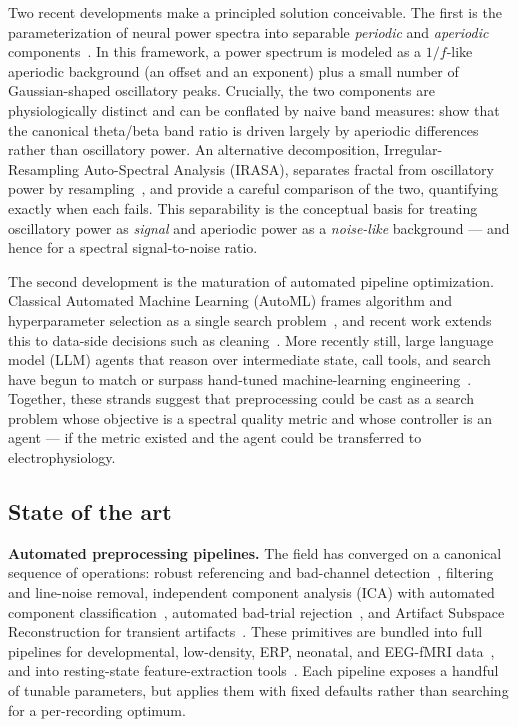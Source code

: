 Two recent developments make a principled solution conceivable. The first is the parameterization of neural power spectra into separable \emph{periodic} and \emph{aperiodic} components~\cite{HallerEtAl2018, DonoghueEtAl2020b}. In this framework, a power spectrum is modeled as a $1/f$-like aperiodic background (an offset and an exponent) plus a small number of Gaussian-shaped oscillatory peaks. Crucially, the two components are physiologically distinct and can be conflated by naive band measures: \citet{DonoghueEtAl2020a} show that the canonical theta/beta band ratio is driven largely by aperiodic differences rather than oscillatory power. An alternative decomposition, Irregular-Resampling Auto-Spectral Analysis (IRASA), separates fractal from oscillatory power by resampling~\cite{WenLiu2016}, and \citet{GersterEtAl2022} provide a careful comparison of the two, quantifying exactly when each fails. This separability is the conceptual basis for treating oscillatory power as \emph{signal} and aperiodic power as a \emph{noise-like} background --- and hence for a spectral signal-to-noise ratio.

The second development is the maturation of automated pipeline optimization. Classical Automated Machine Learning (AutoML) frames algorithm and hyperparameter selection as a single search problem~\cite{ThorntonEtAl2012, FeurerEtAl2015, BischlEtAl2023}, and recent work extends this to data-side decisions such as cleaning~\cite{NeutatzEtAl2022, SiddiqiEtAl2023}. More recently still, large language model (LLM) agents that reason over intermediate state, call tools, and search have begun to match or surpass hand-tuned machine-learning engineering~\cite{GuoEtAl2024, HuangEtAl2023, ChiEtAl2024}. Together, these strands suggest that preprocessing could be cast as a search problem whose objective is a spectral quality metric and whose controller is an agent --- if the metric existed and the agent could be transferred to electrophysiology.

\subsection{State of the art}

\textbf{Automated preprocessing pipelines.} The field has converged on a canonical sequence of operations: robust referencing and bad-channel detection~\cite{BigdelyShamloEtAl2015}, filtering and line-noise removal, independent component analysis (ICA) with automated component classification~\cite{PionTonachiniEtAl2019, LiEtAl2022}, automated bad-trial rejection~\cite{JasEtAl2017}, and Artifact Subspace Reconstruction for transient artifacts~\cite{BlumEtAl2019}. These primitives are bundled into full pipelines for developmental, low-density, ERP, neonatal, and EEG-fMRI data~\cite{GabardDurnamEtAl2018, LopezEtAl2022, MonachinoEtAl2022, KumaravelEtAl2022, MayeliEtAl2021}, and into resting-state feature-extraction tools~\cite{vilaEtAl2023}. Each pipeline exposes a handful of tunable parameters, but applies them with fixed defaults rather than searching for a per-recording optimum.

